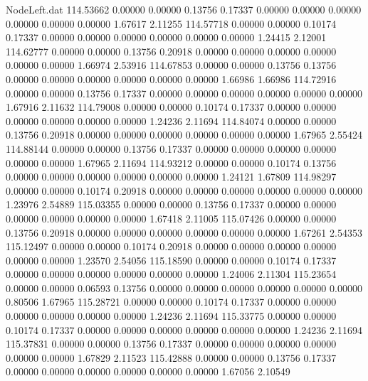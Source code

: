 \begin{filecontents}{NodeLeft.dat}
 114.53662    0.00000    0.00000     0.13756    0.17337    0.00000    0.00000    0.00000    0.00000    0.00000    0.00000    1.67617    2.11255
 114.57718    0.00000    0.00000     0.10174    0.17337    0.00000    0.00000    0.00000    0.00000    0.00000    0.00000    1.24415    2.12001
 114.62777    0.00000    0.00000     0.13756    0.20918    0.00000    0.00000    0.00000    0.00000    0.00000    0.00000    1.66974    2.53916
 114.67853    0.00000    0.00000     0.13756    0.13756    0.00000    0.00000    0.00000    0.00000    0.00000    0.00000    1.66986    1.66986
 114.72916    0.00000    0.00000     0.13756    0.17337    0.00000    0.00000    0.00000    0.00000    0.00000    0.00000    1.67916    2.11632
 114.79008    0.00000    0.00000     0.10174    0.17337    0.00000    0.00000    0.00000    0.00000    0.00000    0.00000    1.24236    2.11694
 114.84074    0.00000    0.00000     0.13756    0.20918    0.00000    0.00000    0.00000    0.00000    0.00000    0.00000    1.67965    2.55424
 114.88144    0.00000    0.00000     0.13756    0.17337    0.00000    0.00000    0.00000    0.00000    0.00000    0.00000    1.67965    2.11694
 114.93212    0.00000    0.00000     0.10174    0.13756    0.00000    0.00000    0.00000    0.00000    0.00000    0.00000    1.24121    1.67809
 114.98297    0.00000    0.00000     0.10174    0.20918    0.00000    0.00000    0.00000    0.00000    0.00000    0.00000    1.23976    2.54889
 115.03355    0.00000    0.00000     0.13756    0.17337    0.00000    0.00000    0.00000    0.00000    0.00000    0.00000    1.67418    2.11005
 115.07426    0.00000    0.00000     0.13756    0.20918    0.00000    0.00000    0.00000    0.00000    0.00000    0.00000    1.67261    2.54353
 115.12497    0.00000    0.00000     0.10174    0.20918    0.00000    0.00000    0.00000    0.00000    0.00000    0.00000    1.23570    2.54056
 115.18590    0.00000    0.00000     0.10174    0.17337    0.00000    0.00000    0.00000    0.00000    0.00000    0.00000    1.24006    2.11304
 115.23654    0.00000    0.00000     0.06593    0.13756    0.00000    0.00000    0.00000    0.00000    0.00000    0.00000    0.80506    1.67965
 115.28721    0.00000    0.00000     0.10174    0.17337    0.00000    0.00000    0.00000    0.00000    0.00000    0.00000    1.24236    2.11694
 115.33775    0.00000    0.00000     0.10174    0.17337    0.00000    0.00000    0.00000    0.00000    0.00000    0.00000    1.24236    2.11694
 115.37831    0.00000    0.00000     0.13756    0.17337    0.00000    0.00000    0.00000    0.00000    0.00000    0.00000    1.67829    2.11523
 115.42888    0.00000    0.00000     0.13756    0.17337    0.00000    0.00000    0.00000    0.00000    0.00000    0.00000    1.67056    2.10549

\end{filecontents}

